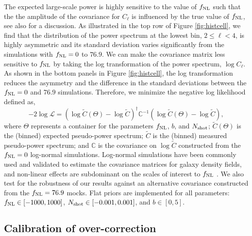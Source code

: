The expected large-scale power is highly sensitive to the value of $f_{\rm NL}$ such that the the amplitude of the covariance for $C_{\ell}$ is influenced by the true value of $f_{\rm NL}$, see also \cite{2013MNRAS.428.1116R} for a discussion. As illustrated in the top row of Figure \ref{fig:histcell}, we find that the distribution of the power spectrum at the lowest bin, $2\leq \ell < 4$, is highly asymmetric and its standard deviation varies significantly from the simulations with $f_{\rm NL}=0$ to $76.9$. We can make the covariance matrix less sensitive to $f_{\rm NL}$ by taking the log transformation of the power spectrum, $\log C_{\ell}$. As shown in the bottom panels in Figure \ref{fig:histcell}, the log transformation reduces the asymmetry and the difference in the standard deviations between the $f_{\rm NL}=0$ and $76.9$ simulations. Therefore, we minimize the negative log likelihood defined as,
\begin{equation}\label{eq:likelihood}
-2\log \mathcal{L} = (\log \tilde{C}(\Theta)-\log \tilde{C})^{\dagger} \mathbb{C}^{-1} (\log \tilde{C}(\Theta)-\log \tilde{C}),
\end{equation}
where $\Theta$ represents a container for the parameters $f_{\rm NL}$, $b$, and $N_{\rm shot}$; $\tilde{C}(\Theta)$ is the (binned) expected pseudo-power spectrum; $\tilde{C}$ is the (binned) measured pseudo-power spectrum; and $\mathbb{C}$ is the covariance on $\log\tilde{C}$ constructed from the $f_{\rm NL}=0$ log-normal simulations. Log-normal simulations have been commonly used and validated to estimate the covariance matrices for galaxy density fields, and non-linear effects are subdominant on the scales of interest to $f_{\rm NL}$ \citep[see, e.g.,][]{2017MNRAS.466.1444C, 2021MNRAS.508.3125F}. We also test for the robustness of our results against an alternative covariance constructed from the $f_{\rm NL}=76.9$ mocks. Flat priors are implemented for all parameters: $f_{\rm NL} \in [-1000, 1000]$, $N_{\rm shot} \in [-0.001, 0.001]$, and $b \in [0, 5]$. 


\subsection{Calibration of over-correction}\label{ssec:calibration}

